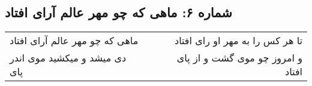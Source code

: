 \begin{center}
\section*{شماره ۶: ماهی که چو مهر عالم آرای افتاد}
\label{sec:006}
\begin{longtable}{l p{0.5cm} r}
ماهی که چو مهر عالم آرای افتاد
&&
تا هر کس را به مهر او رای افتاد
\\
دی میشد و میکشید موی اندر پای
&&
و امروز چو موی گشت و از پای افتاد
\\
\end{longtable}
\end{center}
